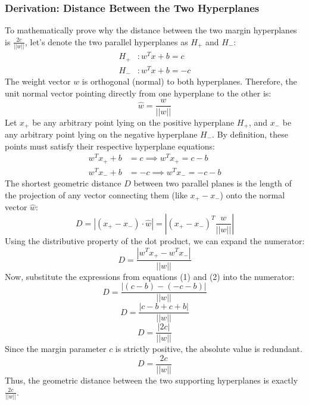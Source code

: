 \documentclass[twoside, 10pt]{article}
\begin{document}
\subsubsection{Derivation: Distance Between the Two Hyperplanes}
To mathematically prove why the distance between the two margin hyperplanes is $\frac{2c}{||w||}$, let's denote the two parallel hyperplanes as $H_+$ and $H_-$:
\begin{align*}
    H_+ &: w^T x + b = c \\
    H_- &: w^T x + b = -c
\end{align*}
The weight vector $w$ is orthogonal (normal) to both hyperplanes. Therefore, the unit normal vector pointing directly from one hyperplane to the other is:
\[ \hat{w} = \frac{w}{||w||} \]
Let $x_+$ be any arbitrary point lying on the positive hyperplane $H_+$, and $x_-$ be any arbitrary point lying on the negative hyperplane $H_-$. By definition, these points must satisfy their respective hyperplane equations:
\begin{align}
    w^T x_+ + b &= c \implies w^T x_+ = c - b \\
    w^T x_- + b &= -c \implies w^T x_- = -c - b
\end{align}
The shortest geometric distance $D$ between two parallel planes is the length of the projection of any vector connecting them (like $x_+ - x_-$) onto the normal vector $\hat{w}$:
\[ D = \left| (x_+ - x_-) \cdot \hat{w} \right| = \left| (x_+ - x_-)^T \frac{w}{||w||} \right| \]
Using the distributive property of the dot product, we can expand the numerator:
\[ D = \frac{|w^T x_+ - w^T x_-|}{||w||} \]
Now, substitute the expressions from equations (1) and (2) into the numerator:
\[ D = \frac{|(c - b) - (-c - b)|}{||w||} \]
\[ D = \frac{|c - b + c + b|}{||w||} \]
\[ D = \frac{|2c|}{||w||} \]
Since the margin parameter $c$ is strictly positive, the absolute value is redundant. 
\[ D = \frac{2c}{||w||} \]
Thus, the geometric distance between the two supporting hyperplanes is exactly $\frac{2c}{||w||}$. 
\end{document}
